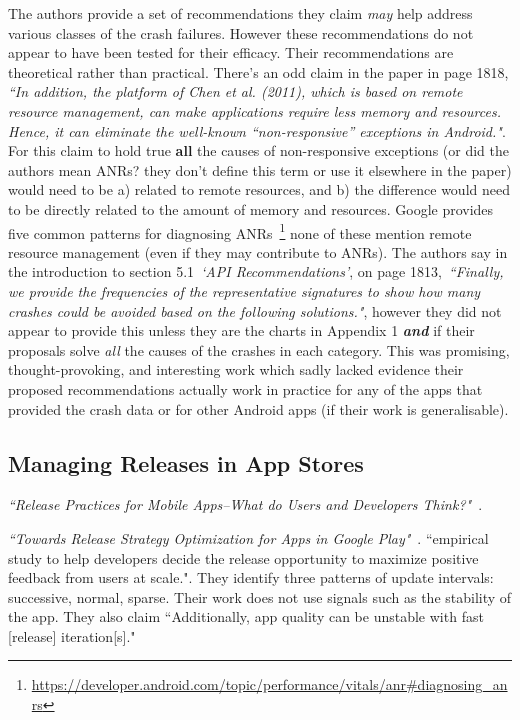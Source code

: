     The authors provide a set of recommendations they claim \emph{may} help address various classes of the crash failures. However these recommendations do not appear to have been tested for their efficacy. Their recommendations are theoretical rather than practical. There's an odd claim in the paper in page 1818, \emph{``In addition, the platform of Chen et al. (2011), which is based on remote resource management, can make applications require less memory and resources. Hence, it can eliminate the well-known “non-responsive” exceptions in Android."}. For this claim to hold true \textbf{all} the causes of non-responsive exceptions (or did the authors mean ANRs? they don't define this term or use it elsewhere in the paper) would need to be a) related to remote resources, and b) the difference would need to be directly related to the amount of memory and resources. Google provides five common patterns for diagnosing ANRs~\footnote{\url{https://developer.android.com/topic/performance/vitals/anr\#diagnosing_anrs}} none of these mention remote resource management (even if they may contribute to ANRs). The authors say in the introduction to section 5.1~\emph{`API Recommendations'}, on page 1813,~\emph{``Finally, we provide the frequencies of the representative signatures to show how many crashes could be avoided based on the following solutions."}, however they did not appear to provide this unless they are the charts in  Appendix 1 \textbf{\textit{and}} if their proposals solve \textit{all} the causes of the crashes in each category. This was promising, thought-provoking, and interesting work which sadly lacked evidence their proposed recommendations actually work in practice for any of the apps that provided the crash data or for other Android apps (if their work is generalisable).


\subsection{Managing Releases in App Stores}

\emph{``Release Practices for Mobile Apps--What do Users and Developers Think?"}~.
    
\emph{``Towards Release Strategy Optimization for Apps in Google Play"}~\cite{shen2017_towards_release_strategy_optimization_for_apps_in_google_play}. ``empirical study to help developers decide the release opportunity to maximize positive feedback from users at scale.". They identify three patterns of update intervals: successive, normal, sparse. Their work does not use signals such as the stability of the app. They also claim ``Additionally, app quality can be unstable with fast [release] iteration[s]."

